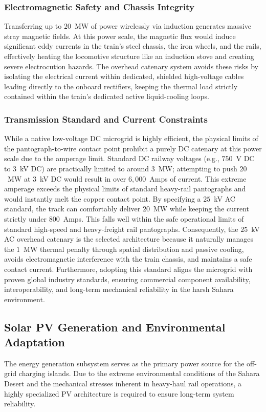 \subsubsection*{Electromagnetic Safety and Chassis Integrity}Transferring up to $20$~MW of power wirelessly via induction generates massive stray magnetic fields. At this power scale, the magnetic flux would induce significant eddy currents in the train’s steel chassis, the iron wheels, and the rails, effectively heating the locomotive structure like an induction stove and creating severe electrocution hazards. The overhead catenary system avoids these risks by isolating the electrical current within dedicated, shielded high-voltage cables leading directly to the onboard rectifiers, keeping the thermal load strictly contained within the train’s dedicated active liquid-cooling loops.
\subsubsection*{Transmission Standard and Current Constraints}While a native low-voltage DC microgrid is highly efficient, the physical limits of the pantograph-to-wire contact point prohibit a purely DC catenary at this power scale due to the amperage limit. Standard DC railway voltages (e.g., $750$~V DC to $3$~kV DC) are practically limited to around $3$~MW; attempting to push $20$~MW at $3$~kV DC would result in over $6,000$~Amps of current. This extreme amperage exceeds the physical limits of standard heavy-rail pantographs and would instantly melt the copper contact point. By specifying a $25$~kV AC standard, the track can comfortably deliver $20$~MW while keeping the current strictly under $800$~Amps. This falls well within the safe operational limits of standard high-speed and heavy-freight rail pantographs. Consequently, the $25$~kV AC overhead catenary is the selected architecture because it naturally manages the $1$~MW thermal penalty through spatial distribution and passive cooling, avoids electromagnetic interference with the train chassis, and maintains a safe contact current. Furthermore, adopting this standard aligns the microgrid with proven global industry standards, ensuring commercial component availability, interoperability, and long-term mechanical reliability in the harsh Sahara environment.


\subsection{Solar PV Generation and Environmental Adaptation \label{Solar}}The energy generation subsystem serves as the primary power source for the off-grid charging islands. Due to the extreme environmental conditions of the Sahara Desert and the mechanical stresses inherent in heavy-haul rail operations, a highly specialized PV architecture is required to ensure long-term system reliability.
